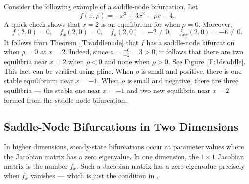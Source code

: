 \documentclass{ximera}
\begin{document}
Consider the following example of a saddle-node bifurcation.  Let 
\begin{equation}  \label{e:sn1}
f(x,\rho) = -x^3 + 3x^2 - \rho x - 4.
\end{equation}
A quick check shows that $x=2$ is an equilibrium for  
when $\rho=0$.  Moreover, 
\[
f(2,0)=0, \quad f_x(2,0)=0, \quad f_\rho(2,0)=-2\neq 0, 
\quad f_{xx}(2,0)=-6\neq 0.
\]
It follows from Theorem~\ref{T:saddlenode} that $f$ has a saddle-node
bifurcation when $\rho=0$ at $x=2$.  Indeed, since $a=\frac{-6}{-2}=3>0$, 
it follows that there are two equilibria near $x=2$ when $\rho<0$ and 
none when $\rho>0$.  See Figure~\ref{F:1dsaddle}. This fact can be 
verified using {\sf pline}.  When $\rho$ is small and positive, there is 
one stable equilibrium near $x=-1$.  When $\rho$ is small and negative, there 
are three equilibria --- the stable one near $x=-1$ and two new equilibria 
near $x=2$ formed from the saddle-node bifurcation.  



\subsection*{Saddle-Node Bifurcations in Two Dimensions}

In higher dimensions, steady-state bifurcations occur at parameter 
values where the Jacobian matrix
has a zero eigenvalue.  In one dimension,
the $1\times 1$ Jacobian matrix is the number $f_x$.  Such a 
Jacobian matrix has a zero eigenvalue precisely when $f_x$ vanishes
--- which is just the condition in .  
\end{document}
